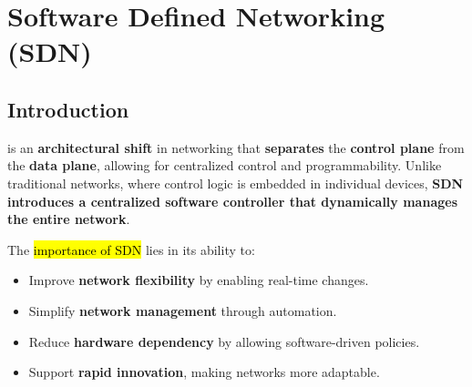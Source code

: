 \section{Software Defined Networking (SDN)}

\subsection{Introduction}

 is an \textbf{architectural shift} in networking that \textbf{separates} the \textbf{control plane} from the \textbf{data plane}, allowing for centralized control and programmability. Unlike traditional networks, where control logic is embedded in individual devices, \textbf{SDN introduces a centralized software controller that dynamically manages the entire network}.  

\highspace
The \hl{importance of SDN} lies in its ability to:
\begin{itemize}
    \item Improve \textbf{network flexibility} by enabling real-time changes.
    \item Simplify \textbf{network management} through automation.
    \item Reduce \textbf{hardware dependency} by allowing software-driven policies.
    \item Support \textbf{rapid innovation}, making networks more adaptable.
\end{itemize}

